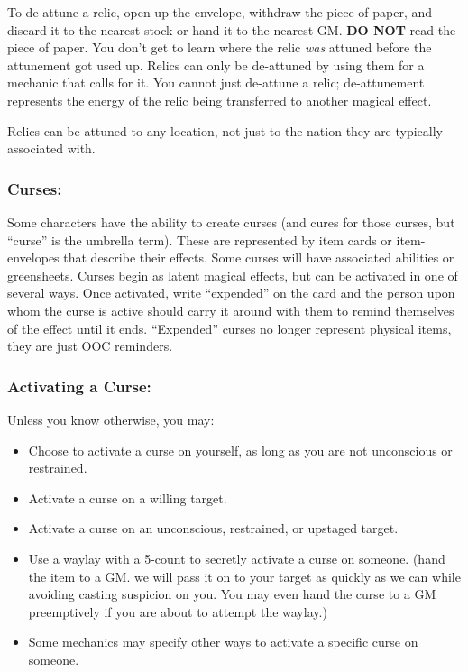 \documentclass[sheet]{GL2020}
\begin{document}
{To de-attune a relic, open up the envelope, withdraw the piece of paper, and discard it to the nearest stock or hand it to the nearest GM. \textbf{DO NOT} read the piece of paper. You don’t get to learn where the relic \emph{was} attuned before the attunement got used up. Relics can only be de-attuned by using them for a mechanic that calls for it. You cannot just de-attune a relic; de-attunement represents the energy of the relic being transferred to another magical effect.

Relics can be attuned to any location, not just to the nation they are typically associated with.

\subsubsection{Curses:}
Some characters have the ability to create curses (and cures for those curses, but ``curse'' is the umbrella term). These are represented by item cards or item-envelopes that describe their effects. Some curses will have associated abilities or greensheets. Curses begin as latent magical effects, but can be activated in one of several ways. Once activated, write ``expended'' on the card and the person upon whom the curse is active should carry it around with them to remind themselves of the effect until it ends. ``Expended'' curses no longer represent physical items, they are just OOC reminders.

\subsubsection{Activating a Curse:}
Unless you know otherwise, you may:
\begin{itemize}
	\item Choose to activate a curse on yourself, as long as you are not unconscious or restrained.
	\item Activate a curse on a willing target. 
	\item Activate a curse on an unconscious, restrained, or upstaged target.
	\item Use a waylay with a 5-count to secretly activate a curse on someone. (hand the item to a GM. we will pass it on to your target as quickly as we can while avoiding casting suspicion on you. You may even hand the curse to a GM preemptively if you are about to attempt the waylay.)
	\item Some mechanics may specify other ways to activate a specific curse on someone.
\end{itemize}

}
\end{document}
